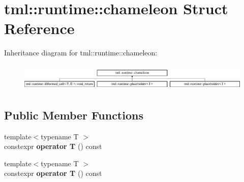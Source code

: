 \hypertarget{structtml_1_1runtime_1_1chameleon}{\section{tml\+:\+:runtime\+:\+:chameleon Struct Reference}
\label{structtml_1_1runtime_1_1chameleon}
}
Inheritance diagram for tml\+:\+:runtime\+:\+:chameleon\+:\begin{figure}[H]
\begin{center}
\leavevmode
\includegraphics[height=1.319199cm]{structtml_1_1runtime_1_1chameleon}
\end{center}
\end{figure}
\subsection*{Public Member Functions}
\begin{DoxyCompactItemize}
\item 
\hypertarget{structtml_1_1runtime_1_1chameleon_a400819ddd792ce377086cc7c31b76e4f}{{\footnotesize template$<$typename T $>$ }\\constexpr {\bfseries operator T} () const }\label{structtml_1_1runtime_1_1chameleon_a400819ddd792ce377086cc7c31b76e4f}

\item 
\hypertarget{structtml_1_1runtime_1_1chameleon_a400819ddd792ce377086cc7c31b76e4f}{{\footnotesize template$<$typename T $>$ }\\constexpr {\bfseries operator T} () const }\label{structtml_1_1runtime_1_1chameleon_a400819ddd792ce377086cc7c31b76e4f}

\end{DoxyCompactItemize}
